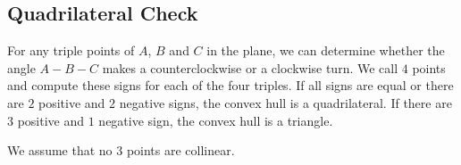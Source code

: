 \documentclass{article}
\begin{document}
\newpage

\subsection{Quadrilateral Check}

For any triple points of $A$, $B$ and $C$ in the plane, we can determine whether the angle $A-B-C$ makes a counterclockwise or a clockwise turn.
We call $4$ points and compute these signs for each of the four triples.
If all signs are equal or there are $2$ positive and $2$ negative signs, the convex hull is a quadrilateral.
If there are $3$ positive and $1$ negative sign, the convex hull is a triangle.

We assume that no $3$ points are collinear.
\end{document}

